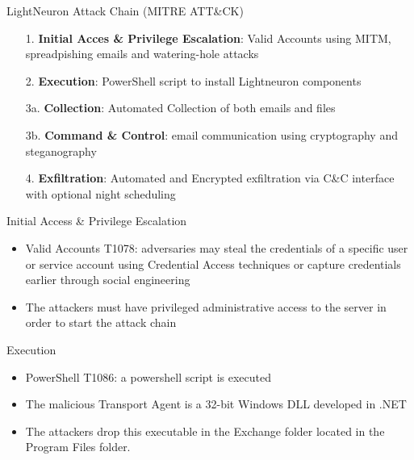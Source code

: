 \begin{frame}[fragile]{LightNeuron Attack Chain (MITRE ATT\&CK)}
    
    \begin{enumerate}
        \item[1.] \textbf{Initial Acces \& Privilege Escalation}: Valid Accounts using MITM, spreadpishing emails and watering-hole attacks
        \item[2.] \textbf{Execution}: PowerShell script to install Lightneuron components
        \item[3a.] \textbf{Collection}: Automated Collection of both emails and files
        \item[3b.] \textbf{Command \& Control}: email communication using cryptography and steganography
        \item[4.] \textbf{Exfiltration}: Automated and Encrypted exfiltration via C\&C interface with optional night scheduling
    \end{enumerate}
\end{frame}

\begin{frame}[fragile]{Initial Access \& Privilege Escalation}
    \begin{itemize}
        \item Valid Accounts T1078: adversaries may steal the credentials of a 
        specific user or service account using Credential Access techniques
         or capture credentials earlier through social engineering \cite{MitreTechniques}
        \item The attackers must have privileged administrative access to 
        the server in order to start the attack chain 
    \end{itemize}
\end{frame}

\begin{frame}[fragile]{Execution}
    \begin{itemize}
        \item PowerShell T1086: a powershell script is executed
        \item The malicious Transport Agent is a 32-bit Windows DLL developed in .NET
        \item The attackers drop this executable in the Exchange folder located in the 
        Program Files folder.  
    \end{itemize}
\end{frame}

